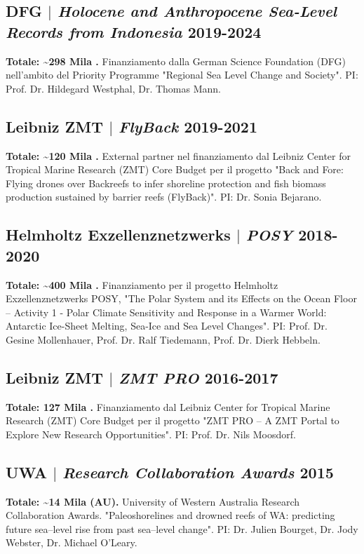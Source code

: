 \documentclass[11pt]{article}
\begin{document}
\bigskip

\subsection{DFG $|$ {\normalfont\textit{Holocene and Anthropocene Sea-Level Records from Indonesia}} \hfill 2019-2024}
{\footnotesize \textbf{Totale: \textasciitilde298 Mila \texteuro.} Finanziamento dalla German Science Foundation (DFG) nell'ambito del Priority Programme "Regional Sea Level Change and Society". PI: Prof. Dr. Hildegard Westphal, Dr. Thomas Mann.}
\bigskip

\subsection{Leibniz ZMT $|$ {\normalfont\textit{FlyBack}} \hfill 2019-2021}
{\footnotesize \textbf{Totale: \textasciitilde120 Mila \texteuro.} External partner nel finanziamento dal Leibniz Center for Tropical Marine Research (ZMT) Core Budget per il progetto "Back and Fore: Flying drones over Backreefs to infer shoreline protection and fish biomass production sustained by barrier reefs (FlyBack)". PI: Dr. Sonia Bejarano.}
\bigskip

\subsection{Helmholtz Exzellenznetzwerks $|$ {\normalfont\textit{POSY}} \hfill 2018-2020}
{\footnotesize \textbf{Totale: \textasciitilde400 Mila \texteuro.} Finanziamento per il progetto Helmholtz Exzellenznetzwerks POSY, "The Polar System and its Effects on the Ocean Floor – Activity 1 - Polar Climate Sensitivity and Response in a Warmer World: Antarctic Ice-Sheet Melting, Sea-Ice and Sea Level Changes". PI: Prof. Dr. Gesine Mollenhauer, Prof. Dr. Ralf Tiedemann, Prof. Dr. Dierk Hebbeln.}
\bigskip

\subsection{Leibniz ZMT $|$ {\normalfont\textit{ZMT PRO}} \hfill 2016-2017}
{\footnotesize \textbf{Totale: 127 Mila \texteuro.} Finanziamento dal Leibniz Center for Tropical Marine Research (ZMT) Core Budget per il progetto "ZMT PRO – A ZMT Portal to Explore New Research Opportunities". PI: Prof. Dr. Nils Moosdorf.}

\bigskip
\subsection{UWA $|$ {\normalfont\textit{Research Collaboration Awards}} \hfill 2015}
{\footnotesize \textbf{Totale: \textasciitilde14 Mila \textdollar (AU).}  University of Western Australia Research Collaboration Awards. "Paleoshorelines and drowned reefs of WA: predicting future sea–level rise from past sea–level change". PI: Dr. Julien Bourget, Dr. Jody Webster, Dr. Michael O'Leary.}
\end{document}
